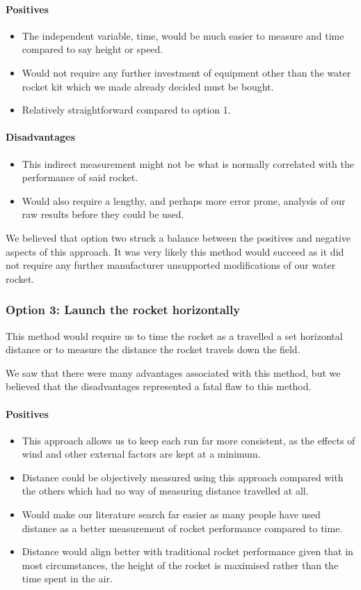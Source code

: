 \documentclass[14pt]{article}
\begin{document}
\paragraph{Positives}
\begin{itemize}
    \item The independent variable, time, would be much easier to measure and time compared to say height or speed.
    \item Would not require any further investment of equipment other than the water rocket kit which we made already decided must be bought.
    \item Relatively straightforward compared to option 1.
\end{itemize}
\paragraph{Disadvantages}
\begin{itemize}
    \item This indirect measurement might not be what is normally correlated with the performance of said rocket.
    \item Would also require a lengthy, and perhaps more error prone, analysis of our raw results before they could be used.
\end{itemize}
We believed that option two struck a balance between the positives and negative aspects of this approach. It was very likely this method would succeed as it did not require any further manufacturer unsupported modifications of our water rocket.
\subsubsection{Option 3: Launch the rocket horizontally}
This method would require us to time the rocket as a travelled a set horizontal distance or to measure the distance the rocket travels down the field. 

We saw that there were many advantages associated with this method, but we believed that the disadvantages represented a fatal flaw to this method.
\paragraph{Positives}
\begin{itemize}
    \item This approach allows us to keep each run far more consistent, as the effects of wind and other external factors are kept at a minimum.
    \item Distance could be objectively measured using this approach compared with the others which had no way of measuring distance travelled at all.
    \item Would make our literature search far easier as many people have used distance as a better measurement of rocket performance compared to time.
    \item Distance would align better with traditional rocket performance given that in most circumstances, the height of the rocket is maximised rather than the time spent in the air.
\end{itemize}
\end{document}
